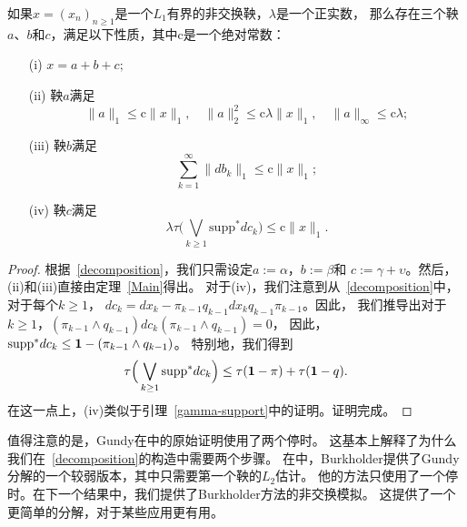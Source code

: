 \begin{corollary}
如果$x=(x_n)_{n \ge 1}$是一个$L_1$有界的非交换鞅，$\lambda$是一个正实数，
那么存在三个鞅$a$、$b$和$c$，满足以下性质，其中$\mathrm{c}$是一个绝对常数：
\begin{itemize}
\item[(i)] $x=a+b+c;$
\item[(ii)] 鞅$a$满足 $$\|a\|_1 \leq \mathrm{c}
\|x\|_1, \quad \|a\|_2^2 \leq \mathrm{c} \lambda \|x\|_1, \quad
\|a\|_\infty \leq \mathrm{c} \lambda;$$
\item[(iii)] 鞅$b$满足 $$\sum_{k=1}^{\infty}
\|db_k\|_1 \le \mathrm{c} \|x\|_1;$$
\item[(iv)] 鞅$c$满足
$$\lambda \tau \Big( \bigvee_{k \ge 1} \mathrm{supp}^* dc_k \Big)
\le \mathrm{c} \|x\|_1.$$
\end{itemize}
\end{corollary}

\begin{proof}
根据~\eqref{decomposition}，我们只需设定$a:=\alpha$，$b:=\beta$和
$c:=\gamma +\upsilon$。然后，(ii)和(iii)直接由定理~\ref{Main}得出。
对于(iv)，我们注意到从~\eqref{decomposition}中，对于每个$k\geq 1$，
$dc_k=dx_k -\pi_{k-1}q_{k-1}dx_kq_{k-1}\pi_{k-1}$。因此，
我们推导出对于$k\geq 1$，$(\pi_{k-1} \wedge q_{k-1})dc_k(\pi_{k-1} \wedge q_{k-1})=0$，
因此，$\mathrm{supp}^* dc_k \leq {\bf 1}-(\pi_{k-1} \wedge q_{k-1})$。
特别地，我们得到 $$\tau \Big( \bigvee_{k \ge 1} \mathrm{supp}^* dc_k \Big) \leq \tau({\bf 1}-\pi) +\tau({\bf 1}-q).$$ 
在这一点上，(iv)类似于引理~\ref{gamma-support}中的证明。证明完成。
\end{proof}
值得注意的是，Gundy在\cite{G}中的原始证明使用了两个停时。
这基本上解释了为什么我们在~\eqref{decomposition}的构造中需要两个步骤。
在\cite{B}中，Burkholder提供了Gundy分解的一个较弱版本，其中只需要第一个鞅的$L_2$估计。
他的方法只使用了一个停时。在下一个结果中，我们提供了Burkholder方法的非交换模拟。
这提供了一个更简单的分解，对于某些应用更有用。


